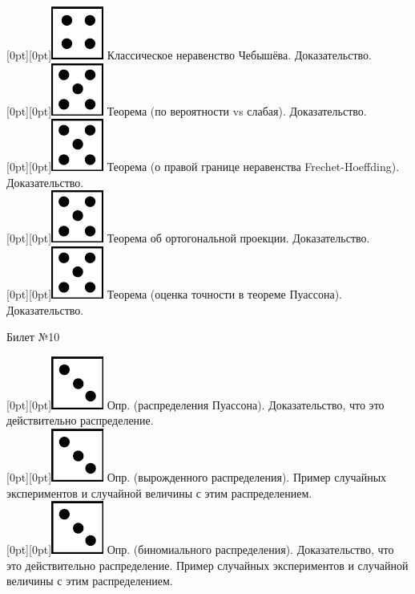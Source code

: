 \documentclass[10pt]{article}
\begin{document}
\raisebox{-1pt}[0pt][0pt]{\includegraphics[width=0.02\linewidth]{4.png}} Классическое неравенство Чебышёва. Доказательство. \\

\raisebox{-1pt}[0pt][0pt]{\includegraphics[width=0.02\linewidth]{5.png}} Теорема (по вероятности vs слабая). Доказательство. \\  

\raisebox{-1pt}[0pt][0pt]{\includegraphics[width=0.02\linewidth]{5.png}} Теорема (о правой границе неравенства Frechet-Hoeffding).  Доказательство. \\

\raisebox{-1pt}[0pt][0pt]{\includegraphics[width=0.02\linewidth]{5.png}} Теорема об ортогональной проекции. Доказательство. \\

\raisebox{-1pt}[0pt][0pt]{\includegraphics[width=0.02\linewidth]{5.png}} Теорема (оценка точности в теореме Пуассона). Доказательство. \\

\begin{center} {\Large Билет №10} \end{center} 

\raisebox{-1pt}[0pt][0pt]{\includegraphics[width=0.02\linewidth]{3.png}}  Опр. (распределения Пуассона). Доказательство, что это действительно распределение. \\

\raisebox{-1pt}[0pt][0pt]{\includegraphics[width=0.02\linewidth]{3.png}} Опр. (вырожденного распределения). Пример случайных экспериментов и случайной величины с этим распределением. \\

\raisebox{-1pt}[0pt][0pt]{\includegraphics[width=0.02\linewidth]{3.png}}  Опр. (биномиального распределения). Доказательство, что это действительно распределение. Пример случайных экспериментов и случайной величины с этим распределением. \\     
\end{document}
